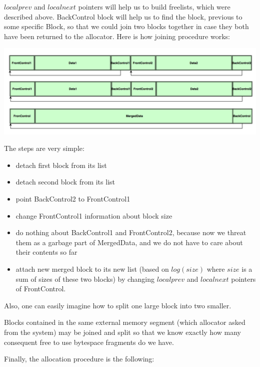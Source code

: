 \documentclass{article}
\begin{document}
$localprev$ and $localnext$ pointers will help us to build freelists, which were described above. BackControl block will help us to find the block, previous to some specific Block, so that we could join two blocks together in case they both have been returned to the allocator. Here is how joining procedure works:

\begin{center}\includegraphics[width=1 \textwidth]{image3.png}\end{center}

The steps are very simple:

\begin{itemize}
\item detach first block from its list
\item detach second block from its list
\item point BackControl2 to FrontControl1
\item change FrontControl1 information about block size
\item do nothing about BackControl1 and FrontControl2, because now we threat them as a garbage part of MergedData, and we do not have to care about their contents so far
\item attach new merged block to its new list (based on $log(size)$ where $size$ is a sum of sizes of these two blocks) by changing $localprev$ and $localnext$ pointers of FrontControl.
\end{itemize}

Also, one can easily imagine how to split one large block into two smaller.

Blocks contained in the same external memory segment (which allocator asked from the system) may be joined and split so that we know exactly how many consequent free to use bytespace fragments do we have.

Finally, the allocation procedure is the following:
\end{document}
